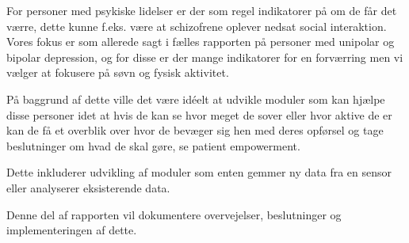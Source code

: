 For personer med psykiske lidelser er der som regel indikatorer på om de får det værre, dette kunne f.eks. være at schizofrene oplever nedsat social interaktion. 
Vores fokus er som allerede sagt i fælles rapporten på personer med unipolar og bipolar depression, og for disse er der mange indikatorer for en forværring men vi vælger at fokusere på søvn og fysisk aktivitet.

På baggrund af dette ville det være idéelt at udvikle moduler som kan hjælpe disse personer idet at hvis de kan se hvor meget de sover eller hvor aktive de er kan de få et overblik over hvor de bevæger sig hen med deres opførsel og tage beslutninger om hvad de skal gøre, se patient empowerment. 

Dette inkluderer udvikling af moduler som enten gemmer ny data fra en sensor eller analyserer eksisterende data.

Denne del af rapporten vil dokumentere overvejelser, beslutninger og implementeringen af dette.